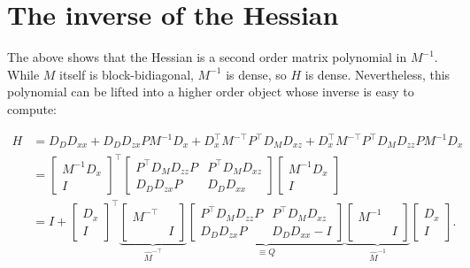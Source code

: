 \documentclass{article}
\begin{document}
\section{The inverse of the Hessian}

The above shows that the Hessian is a second order matrix polynomial in $M^{-1}$. While $M$ itself is block-bidiagonal,
$M^{-1}$ is dense, so $H$ is dense. Nevertheless, this polynomial can be lifted into a higher order object whose
inverse is easy to compute:

\begin{align}
  H & = D_DD_{xx}  + D_DD_{zx} PM^{-1} D_x + D_x^\top M^{-\top}P^\top D_M D_{xz}+D_x^\top M^{-\top}P^\top D_M D_{zz}P M^{-1}D_x \\
  & =
  \begin{bmatrix}
    M^{-1}D_x \\ I
  \end{bmatrix}
  ^\top
  \begin{bmatrix}
    P^\top D_M D_{zz} P & P^\top D_M D_{xz} \\
    D_D D_{zx} P        & D_D D_{xx}
  \end{bmatrix}
  \begin{bmatrix}
    M^{-1}D_x \\ I
  \end{bmatrix}
  \\
  & = I +
  \begin{bmatrix}
    D_x \\ I
  \end{bmatrix}
  ^\top
  \underbrace{
    \begin{bmatrix}
      M^{-\top} & \\ & I
    \end{bmatrix}
  }_{\hat{M}^{-\top}}
  \underbrace{
    \begin{bmatrix}
      P^\top D_M D_{zz} P & P^\top D_M D_{xz} \\
      D_D D_{zx} P        & D_D D_{xx}-I
    \end{bmatrix}
  }_{\equiv Q}
  \underbrace{
    \begin{bmatrix}
      M^{-1} & \\ & I
    \end{bmatrix}
  }_{\hat{M}^{-1}}
  \begin{bmatrix}
    D_x \\ I
  \end{bmatrix}
  .
\end{align}
\end{document}
